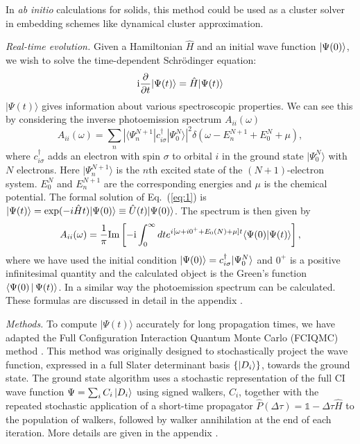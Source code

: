 \documentclass[aps,prl,twocolumn,showpacs,superscriptaddress,floatfix]{revtex4-1}
\def \Schrodinger {{Schr\"{o}dinger }}
\begin{document}
In {\it ab initio} calculations for solids, this method could be used as a
cluster solver in embedding schemes like dynamical cluster approximation\cite{dca}.

{\it Real-time evolution.}
\label{sec:rneci}
Given a Hamiltonian $\hat{H}$ and an initial wave function $\Ket{\Psi(0)}$, we wish to solve                          
the time-dependent \Schrodinger equation: 
\begin{equation}\label{eq:1}
\mathrm{i}{\partial \over \partial t}|\Psi(t)\rangle  =  \hat{H}|\Psi(t)\rangle
\end{equation}
$|\Psi(t)\rangle$ gives information about various spectroscopic properties. We can see this by considering the
inverse photoemission spectrum $A_{ii}(\omega)$ 
\begin{equation}\label{eq:2}
A_{ii}(\omega)=\sum_n|\langle\Psi_n^{N+1}|c_{i\sigma}^{\dagger}|\Psi_0^N\rangle|^2\delta(\omega-E_n^{N+1}+E_0^{N}+\mu),
\end{equation}
where $c_{i\sigma}^{\dagger}$ adds an electron with spin $\sigma$ to  orbital $i$ in the ground state $|\Psi_0^N\rangle$ with $N$ electrons. Here $|\Psi_n^{N+1}\rangle$
is the $n$th excited state of the $(N+1)$-electron system.  $E_0^{N}$ and $E_n^{N+1}$ are the corresponding
energies and $\mu$ is the chemical potential. The formal solution of Eq.~(\ref{eq:1}) is $|\Psi(t)\rangle =
{\rm exp}(-i\hat H t)|\Psi(0)\rangle\equiv \hat U(t)|\Psi(0)\rangle$.
The spectrum is then given by
\begin{equation}\label{eq:3}
A_{ii}(\omega)={1\over \pi}{\rm Im} \left[-\mathrm{i}\int_0^{\infty}dt e^{i[\omega+i0^{+}+E_0(N)+\mu]t}\langle \Psi(0)|\Psi(t)\rangle\right],
\end{equation}
where we have used the initial condition
$\Ket{\Psi(0)}=c_{i\sigma}^{\dagger}|\Psi_0^N\rangle$ and $0^{+}$ is a positive
infinitesimal quantity and the calculated object is the Green's function $\Braket{\Psi(0)|\Psi(t)}$.
In a similar way the photoemission spectrum can be calculated. These formulas
are discussed in detail in the appendix \cite{supplement}.

{\it Methods.} To compute $|\Psi(t) \rangle$ accurately for long propagation times,   
we have adapted the Full Configuration Interaction Quantum Monte Carlo (FCIQMC) method \cite{BAT2009,BA2010,CBA2010,BGKA2012}.
This method was originally designed to stochastically project the wave function,
expressed in a full Slater determinant basis $\{\ket{D_i}\}$,  towards the ground state. 
The ground state algorithm uses a stochastic representation of the full CI wave function $\Psi=\sum_i C_i \ket{D_i}$ using 
signed walkers, $C_i$, together with the repeated stochastic application of a short-time propagator $\hat{P}(\Delta \tau) 
= \mathds{1} - \Delta \tau \hat{H}$ to the population of walkers, followed by walker annihilation at the end of each iteration. 
More details are given in the appendix \cite{supplement}.  
\end{document}
